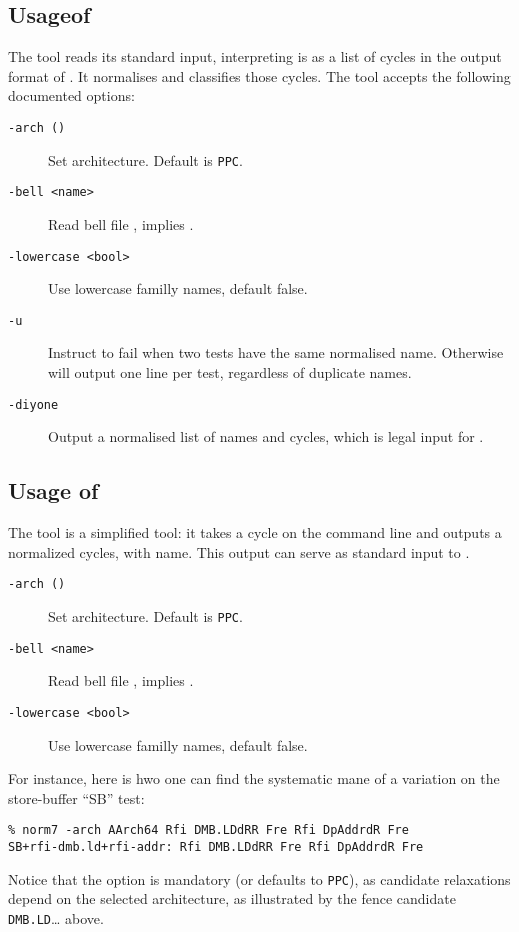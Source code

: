 \subsection{Usage\label{classify:usage}of \classify}
The tool \classify{} reads its standard input, interpreting is as
a list of cycles in the output format of \mcycles.
It normalises and classifies those cycles.
The tool \classify{} accepts the following documented options:
\begin{description}
\item[{\tt -arch (\allarch)}] Set architecture. Default is \texttt{PPC}.
\item[{\tt -bell <name>}]  Read bell file ,
implies  .
\item[{\tt -lowercase <bool>}] Use lowercase familly names, default false.
\item[{\tt -u}] Instruct \classify{} to fail when two tests have the same
normalised name. Otherwise \classify{} will output one line per test,
regardless of duplicate names.
\item[{\tt -diyone}] Output a normalised list of names and cycles,
which is legal input for \diyone.
\end{description}

\subsection{Usage\label{norm:usage} of \norm}
The tool \norm{} is a simplified \classify{} tool: it takes
a cycle on the command line and outputs a normalized cycles, with name.
This output can serve as standard input to \diyone.

\begin{description}
\item[{\tt -arch (\allarch)}] Set architecture. Default is \texttt{PPC}.
\item[{\tt -bell <name>}]  Read bell file , implies .
\item[{\tt -lowercase <bool>}] Use lowercase familly names, default false.
\end{description}

For instance, here is hwo one can find the systematic mane of a variation
on the store-buffer ``\textsf{SB}'' test:
\begin{verbatim}
% norm7 -arch AArch64 Rfi DMB.LDdRR Fre Rfi DpAddrdR Fre
SB+rfi-dmb.ld+rfi-addr: Rfi DMB.LDdRR Fre Rfi DpAddrdR Fre
\end{verbatim}
Notice that the option  is mandatory (or defaults to \texttt{PPC}),
as  candidate relaxations depend on the selected architecture, as illustrated
by the fence candidate \texttt{DMB.LD}\ldots{} above.

\endinput
